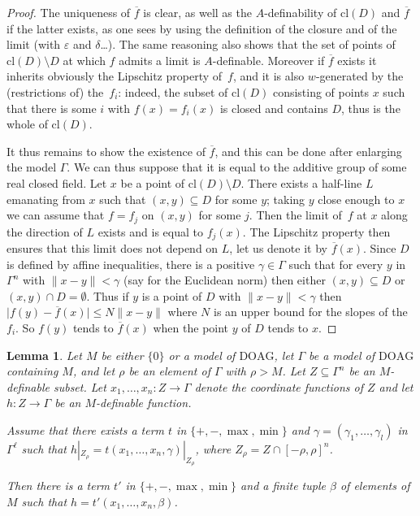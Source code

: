 \documentclass[10pt]{amsart}
\newtheorem{lemm}[subsection]{Lemma}
\theoremstyle{definition}
\theoremstyle{remark}
\newcommand{\abs}[1]{\mathopen|#1\mathclose|}
\newcommand{\cl}{\mathrm{cl}}
\newcommand{\DOAG}{\mathrm{DOAG}}
\let\epsilon\varepsilon
\let\subset\subseteq
\theoremstyle{plain}
\theoremstyle{definition}
\begin{document}
\begin{proof}
The uniqueness of $\overline f$ is clear, as well
as the $A$-definability of $\cl (D)$ and $\overline f$
if the latter exists, as one sees by
using the definition of the closure and of the limit
(with $\epsilon$ and $\delta$\ldots). The same reasoning
also shows that the set of points of $\cl (D) \setminus D$ at which $f$
admits a limit is $A$-definable.
Moreover if $\overline f$ exists it inherits obviously the Lipschitz
property of~$f$, and it is also $w$-generated by the (restrictions of)
the~$f_i$: indeed, the subset of $\cl (D)$ consisting of points $x$
such that there is some $i$ with $f(x)=f_i(x)$ is closed and contains $D$, thus is the whole of $\cl (D)$.

It thus remains to show the existence of $\overline f$,
and this can be done after enlarging the model $\Gamma$.
We can thus suppose that it is equal to the additive group of some
real closed field.
Let $x$ be a point of $\cl (D) \setminus D$.
There exists a half-line $L$ emanating from
$x$ such that $(x,y)\subset D$ for some $y$;
taking $y$ close enough to $x$ we can assume that $f=f_j$ on
$(x,y)$ for some $j$. Then the limit of~$f$
at $x$ along the direction of $L$ exists and is equal to $f_j(x)$.
The Lipschitz property then ensures
that this limit does not depend on $L$,
let us
denote it by $\overline f(x)$. Since $D$
is defined by affine inequalities, there is a positive
$\gamma\in \Gamma$ such that for every $y$
in $\Gamma^n$ with $\|x-y\|<\gamma$
(say for the Euclidean norm) then either $(x,y)\subset D$
or $(x,y)\cap D=\emptyset$. Thus if $y$ is a point of $D$
with $\|x-y\|<\gamma$ then
$\abs{f(y)-\overline f(x)}\leq N\|x-y\|$
where $N$ is an upper bound for the slopes of the $f_i$.
So $f(y)$ tends to $\overline f(x)$ when the point $y$
of $D$ tends to $x$.
\end{proof}

\begin{lemm} \label{lem:comp-l-gen}
Let $M$ be either $\{0\}$ or a model of $\DOAG$, let
$\Gamma$ be a model of $\DOAG$
containing $M$, and let $\rho$
be an element of $\Gamma$
with $\rho >M$.
Let $Z\subseteq \Gamma^n$ be
an $M$-definable subset. Let $x_1,\ldots,x_n:Z \to \Gamma$ denote the coordinate functions of $Z$ and let $h:Z\to \Gamma$ be an
$M$-definable function.

Assume that there
exists a term $t$
in
$\{+,-,\max,\min\}$ and
$\gamma=(\gamma_1,\ldots,\gamma_l)$
in $\Gamma^\ell$
such that $h|_{Z_\rho}=t(x_1,\ldots,x_n,\gamma)|_{Z_\rho}$,
where $Z_\rho=Z\cap [-\rho,\rho]^n$.

Then there is a term $t'$ in $\{+,-,\max,\min\}$ and
a finite tuple $\beta$ of elements of~$M$ such that $h=t'(x_1,\ldots,x_n,\beta)$.
\end{lemm}
\end{document}
